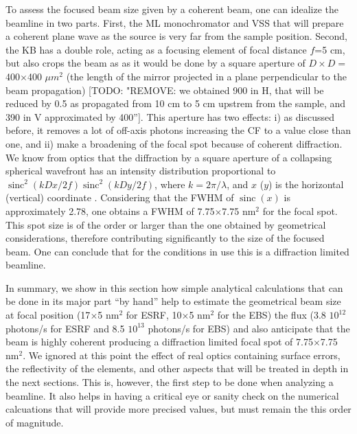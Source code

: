 \documentclass{iucr}              %
\newcommand{\todo}[1]{{\color{red}[TODO: "#1'']}}
\DeclareMathOperator{\sinc}{sinc}
\begin{document}
To assess the focused beam size given by a coherent beam, one can idealize the beamline in two parts. First, the ML monochromator and VSS that will prepare a coherent plane wave as the source is very far from the sample position. Second, the KB has a double role, acting as a focusing element of focal distance $f$=5 cm, but also crops the beam as as it would be done by a square aperture of $D \times D=$ 400$\times$400 $\mu m^2$ (the length of the mirror projected in a plane perpendicular to the beam propagation) 
\todo{REMOVE: we obtained 900 in H, that will be reduced by 0.5 as propagated from 10 cm to 5 cm upstrem from the sample, and 390 in V approximated by 400}. This aperture has two effects: i) as discussed before, it removes a lot of off-axis photons increasing the CF to a value close than one, and ii) make a broadening of the focal spot because of coherent diffraction. We know from optics that the diffraction by a square aperture of a collapsing spherical wavefront has an intensity distribution proportional to $\sinc^2(k D x/2 f) \sinc^2(k D y / 2 f)$, where $k=2\pi/\lambda$, and $x$ ($y$) is the horizontal (vertical) coordinate . Considering that the FWHM of $\sinc(x)$ is approximately 2.78, one obtains a FWHM of 7.75$\times$7.75 nm$^2$ for the focal spot. This spot size is of the order or larger than the one obtained by geometrical considerations, therefore contributing significantly to the size of the focused beam. One can conclude that for the conditions in use this is a diffraction limited beamline. 


In summary, we show in this section how simple analytical calculations that can be done in its major part ``by hand'' help to estimate the geometrical beam size at focal position (17$\times$5 nm$^2$ for ESRF, 10$\times$5 nm$^2$ for the EBS) the flux (3.8 $10^{12}$ photons/s for ESRF and 8.5 $10^{13}$ photons/s for EBS) and also anticipate that the beam is highly coherent producing a diffraction limited focal spot of  7.75$\times$7.75 nm$^2$. We ignored at this point the effect of real optics containing surface errors, the reflectivity of the elements, and other aspects that will be treated in depth in the next sections. This is, however, the first step to be done when analyzing a beamline. It also helps in having a critical eye or sanity check on the numerical calcuations that will provide more precised values, but must remain the this order of magnitude.  


% 
\end{document}
